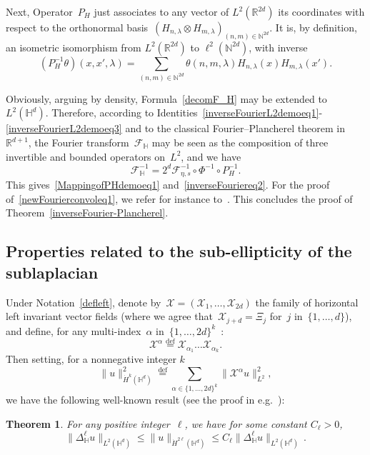 \documentclass[10pt]{amsart}
\newtheorem{theo}{Theorem}[section]
\theoremstyle{definition}\newtheorem{defi}[theo]{Definition}\newtheorem{rema}[theo]{Remark}\newtheorem{exam}[theo]{Example}\newtheorem{exem}[theo]{Example}\newtheorem{nota}[theo]{Notation}
\newcommand{\lam}{\lambda}
\newcommand*\cF{\mathcal{F}}
\newcommand*\cX{\mathcal{X}}
\newcommand*\N{\mathbb{N}}
\newcommand*\R{\mathbb{R}}
\newcommand*\bbH{\mathbb{H}}
\newcommand*\eqdefa{\overset{\mathrm{def}}{=}}
\begin{document}
Next, Operator~$P_H$ just associates to any vector of $L^2(\R^{2d})$ its coordinates with respect to the orthonormal basis~$\left(H_{n,\lam}\otimes H_{m,\lam} \right)_{(n,m)\in \N^{2d}}$. It is, by definition, an isometric isomorphism from $L^2(\R^{2d})$ to $\ell^2(\N^{2d})$, with inverse
\begin{equation}\label{inverseFourierL2demoeq3}
(P_H^{-1} \theta)(x,x',\lam) = \sum_{(n,m)\in \N^{2d}} \theta(n,m,\lam) H_{n,\lam} (x) H_{m,\lam}(x').
\end{equation}

Obviously, arguing by density, Formula~\eqref{decomF_H} may be extended to $L^2(\bbH^d)$. Therefore, according to Identities~\eqref{inverseFourierL2demoeq1}-\eqref{inverseFourierL2demoeq3} and to the classical Fourier--Plancherel theorem in~$\R^{d+1}$, the Fourier transform~$\cF_\bbH$ may be seen as the composition of three invertible and bounded operators on~$L^2$, and we have
\[
\cF_\bbH^{-1} = 2^d \cF_{\eta,s}^{-1} \circ \Phi^{-1} \circ P_H^{-1}.
\]
This gives~\eqref{MappingofPHdemoeq1} and~\eqref{inverseFouriereq2}. For the proof of~\eqref{newFourierconvoleq1}, we refer for instance to~\cite{bcdFHspace}. This concludes the proof of Theorem~\ref{inverseFourier-Plancherel}.

\subsection{Properties related to the sub-ellipticity of the sublaplacian} \label{subellipticity}

Under Notation~\eqref{defleft}, denote by~${\cX}=(\cX_1,\dots,\cX_{2d})$ the family of horizontal left invariant vector fields (where we agree that~$\cX_{j+d}=\Xi_j$ for~$j$ in~$ \{1,\dots, d\}$), and define, for any multi-index~$\alpha$ in~$ \{1,\dots, 2d\}^k$~:
\begin{equation}\label{prodreal}
\mathcal{\cX}^{\alpha} \eqdefa \cX_{\alpha_1}\dots
\cX_{\alpha_k}.
\end{equation}
Then setting, for a nonnegative integer $k$
\[
\|u\|_{\dot H^k(\bbH^d)}^2 \eqdefa \sum_{\alpha\in \{1,\dots,2d\}^k} \|\cX^\alpha u\|_{L^2}^2,
\]
we have the following well-known result (see the proof in e.g.~\cite{CCX,H}):

\begin{theo}\label{maximalestimatepaire}
For any positive integer~$\ell$, we have for some constant $C_\ell>0$,
\[
\|\Delta_{\bbH} ^\ell u\|_{L^2(\bbH^d)}\leq \|u\|_{\dot H^{2\ell}(\bbH^d)}
\leq C_\ell\|\Delta_{\bbH} ^\ell u\|_{L^2(\bbH^d)}\,.
\]
\end{theo}
\end{document}
